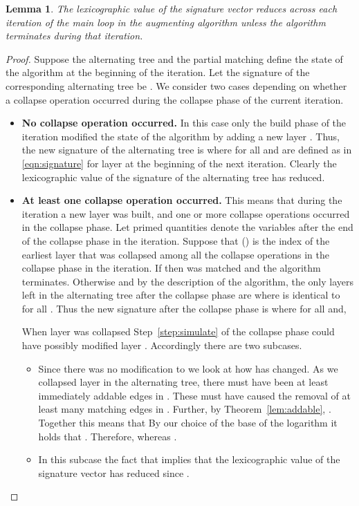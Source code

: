 \documentclass[11pt]{article}
\newtheorem{lemma}[theorem]{Lemma}
\theoremstyle{definition}
\theoremstyle{remark}
\begin{document}
\begin{lemma}\label{lem:decrease}
  The lexicographic value of the signature vector reduces across each iteration of the main loop in the augmenting algorithm unless the algorithm terminates during that iteration.
\end{lemma}
\begin{proof}
  Suppose the alternating tree  and the partial matching  define the state of the algorithm at the beginning of the iteration. Let the signature of the corresponding alternating tree be . We consider two cases depending on whether a collapse operation occurred during the collapse phase of the current iteration.
  
  \begin{itemize}
  \item \textbf{No collapse operation occurred.}  In this case only the build phase of the iteration modified the state of the algorithm by adding a new layer . Thus, the new signature of the alternating tree is  where  for all  and  are defined as in \eqref{eqn:signature} for layer  at the beginning of the next iteration. Clearly the lexicographic value of the signature of the alternating tree has reduced.

  \item \textbf{At least one collapse operation occurred.}  This means that during the iteration a new layer  was built, and one or more collapse operations occurred in the collapse phase. Let primed quantities denote the variables after the end of the collapse phase in the iteration. Suppose that  () is the index of the earliest layer that was collapsed among all the collapse operations in the collapse phase in the iteration. If  then  was matched and the algorithm terminates. Otherwise  and by the description of the algorithm, the only layers left in the alternating tree after the collapse phase are  where  is identical to  for all . Thus the new signature after the collapse phase is  where  for all  and,

When layer  was collapsed Step~\ref{step:simulate} of the collapse phase could have possibly modified layer . Accordingly there are two subcases.

\begin{itemize}
\item  Since there was no modification to  we look at how  has changed. As we collapsed layer  in the alternating tree, there must have been at least  immediately addable edges in . These must have caused the removal of at least  many matching edges in . Further, by Theorem~\ref{lem:addable}, . Together this means that 
 By our choice of the base of the logarithm it holds that . Therefore,   whereas .

\item  In this subcase the fact that  implies that the lexicographic value of the signature vector has reduced since .
\end{itemize}
  \end{itemize}
\end{proof}
\end{document}
